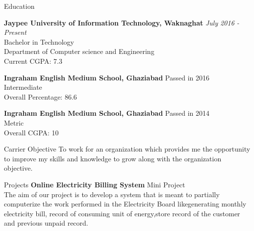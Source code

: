 \documentclass{resume} %
\begin{document}

\begin{rSection}{Education}

{\bf Jaypee University of Information Technology, Waknaghat} \hfill {\em July 2016 - Present} 
\\ Bachelor in Technology
\\ Department of Computer science and Engineering\\
 { Current CGPA: 7.3 }
 
 {\bf Ingraham English Medium School, Ghaziabad} \hfill {Passed in 2016} 
\\ Intermediate\\{ Overall Percentage: 86.6 }

 {\bf Ingraham English Medium School, Ghaziabad} \hfill {Passed in 2014} 
\\ Metric\\{ Overall CGPA: 10 }


\end{rSection}

\begin{rSection}{Carrier Objective}
 To work for an organization which provides me the opportunity to improve my skills and knowledge to grow along with the organization objective.
\end{rSection}


\begin{rSection}{Projects}
{\bf Online Electricity Billing System}
{\newline Mini Project} 
\\The aim of our project is to develop a system that is meant to partially computerize the work performed in the Electricity Board likegenerating monthly electricity bill, record of consuming unit of energy,store record of the customer and previous unpaid record.\\
\end{rSection}
\end{document}
